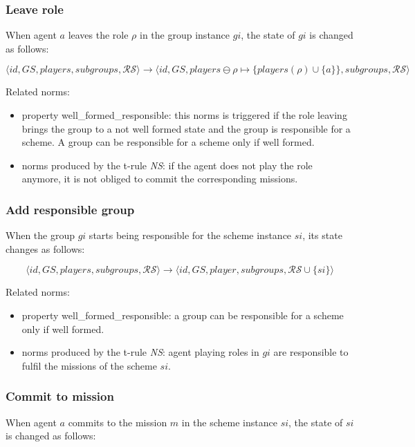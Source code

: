 \documentclass{article}
\newcommand{\set}[1]{\mathcal{#1}}
\newcommand{\rwlabel}[1]{{\scshape\itshape\textrm{#1}}}
\theoremstyle{definition} \newtheorem{definition}{Definition}
\begin{document}
\subsubsection{Leave role}

When agent $a$ leaves the role $\rho$ in the group instance $gi$, the
state of $gi$ is changed as follows:

\[
\langle id, GS, players, subgroups, \set{RS} \rangle  \longrightarrow 
\langle id, GS, players \ominus \rho \mapsto \{ players(\rho) \cup \{a\} \}, subgroups, \set{RS} \rangle  
\]

Related norms:
\begin{itemize}
\item property well\_formed\_responsible: this norms is triggered if
  the role leaving brings the group to a not well formed state and the
  group is responsible for a scheme. A group can be responsible for a
  scheme only if well formed.
\item norms produced by the t-rule \rwlabel{NS}: if the agent does not
  play the role anymore, it is not obliged to commit the corresponding
  missions.
\end{itemize}

\subsubsection{Add responsible group}

When the group $gi$ starts being responsible for the scheme instance
$si$, its state changes as follows:

\[
\langle id, GS, players, subgroups, \set{RS} \rangle  \longrightarrow 
\langle id, GS, player, subgroups, \set{RS} \cup \{ si \} \rangle  
\]

Related norms:
\begin{itemize}
\item property well\_formed\_responsible: a group can be responsible
  for a scheme only if well formed.
\item norms produced by the t-rule \rwlabel{NS}: agent playing roles
  in $gi$ are responsible to fulfil the missions of the scheme $si$.
\end{itemize}

\subsubsection{Commit to mission}

When agent $a$ commits to the mission $m$ in the scheme instance $si$, the
state of $si$ is changed as follows:
\end{document}
